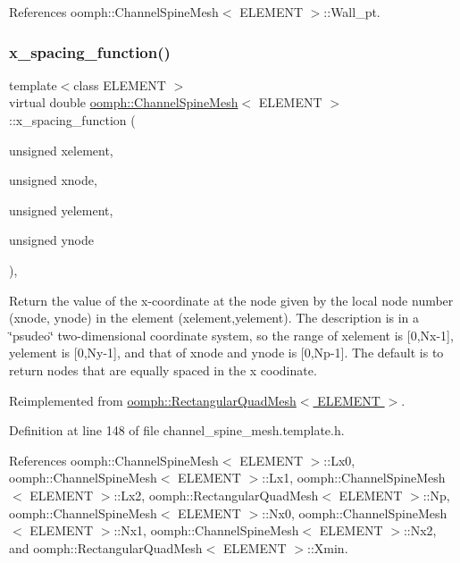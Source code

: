 References oomph\+::\+Channel\+Spine\+Mesh$<$ E\+L\+E\+M\+E\+N\+T $>$\+::\+Wall\+\_\+pt.

\mbox{\label{classoomph_1_1ChannelSpineMesh_a16e0d4264443b1beb274753b0d6b970e}} 
\subsubsection{\texorpdfstring{x\+\_\+spacing\+\_\+function()}{x\_spacing\_function()}}
{\footnotesize\ttfamily template$<$class E\+L\+E\+M\+E\+NT $>$ \\
virtual double \hyperlink{classoomph_1_1ChannelSpineMesh}{oomph\+::\+Channel\+Spine\+Mesh}$<$ E\+L\+E\+M\+E\+NT $>$\+::x\+\_\+spacing\+\_\+function (\begin{DoxyParamCaption}\item[{unsigned}]{xelement,  }\item[{unsigned}]{xnode,  }\item[{unsigned}]{yelement,  }\item[{unsigned}]{ynode }\end{DoxyParamCaption})\hspace{0.3cm}{\ttfamily [inline]}, {\ttfamily [virtual]}}



Return the value of the x-\/coordinate at the node given by the local node number (xnode, ynode) in the element (xelement,yelement). The description is in a \char`\"{}psudeo\char`\"{} two-\/dimensional coordinate system, so the range of xelement is \mbox{[}0,Nx-\/1\mbox{]}, yelement is \mbox{[}0,Ny-\/1\mbox{]}, and that of xnode and ynode is \mbox{[}0,Np-\/1\mbox{]}. The default is to return nodes that are equally spaced in the x coodinate. 



Reimplemented from \hyperlink{classoomph_1_1RectangularQuadMesh_ad4c2f349cf201cb3107f0a4e5447c16f}{oomph\+::\+Rectangular\+Quad\+Mesh$<$ E\+L\+E\+M\+E\+N\+T $>$}.



Definition at line 148 of file channel\+\_\+spine\+\_\+mesh.\+template.\+h.



References oomph\+::\+Channel\+Spine\+Mesh$<$ E\+L\+E\+M\+E\+N\+T $>$\+::\+Lx0, oomph\+::\+Channel\+Spine\+Mesh$<$ E\+L\+E\+M\+E\+N\+T $>$\+::\+Lx1, oomph\+::\+Channel\+Spine\+Mesh$<$ E\+L\+E\+M\+E\+N\+T $>$\+::\+Lx2, oomph\+::\+Rectangular\+Quad\+Mesh$<$ E\+L\+E\+M\+E\+N\+T $>$\+::\+Np, oomph\+::\+Channel\+Spine\+Mesh$<$ E\+L\+E\+M\+E\+N\+T $>$\+::\+Nx0, oomph\+::\+Channel\+Spine\+Mesh$<$ E\+L\+E\+M\+E\+N\+T $>$\+::\+Nx1, oomph\+::\+Channel\+Spine\+Mesh$<$ E\+L\+E\+M\+E\+N\+T $>$\+::\+Nx2, and oomph\+::\+Rectangular\+Quad\+Mesh$<$ E\+L\+E\+M\+E\+N\+T $>$\+::\+Xmin.



